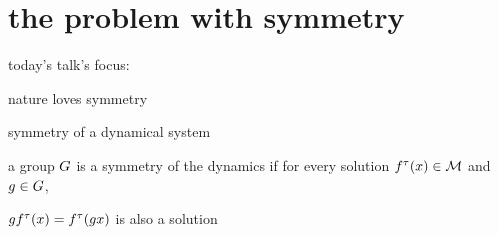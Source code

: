 \section[Das Problem]{the problem with symmetry}


\begin{frame}{}
today's talk's focus:
\begin{block}{}
{\Huge
nature loves symmetry
}
\end{block}
\end{frame}

\begin{frame}{symmetry of a dynamical system}
\begin{block}{a group $G$ is a {symmetry} of the dynamics if}
for every solution ${f^{\tau}(x)} \in {\cal M}$ and  $g \in G$,

\medskip

$g {f^{\tau}(x)} = {f^{\tau}(gx)}$ is also a solution
\end{block}
\end{frame}


